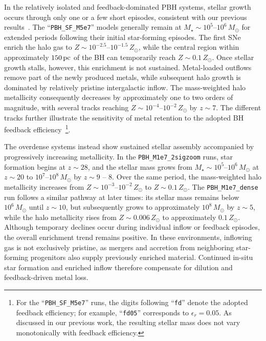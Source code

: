 \documentclass[twocolumn,trackchanges]{aastex701}
\begin{document}
In the relatively isolated and feedback-dominated PBH systems, stellar growth occurs through only one or a few short episodes, consistent with our previous results~\citep{ZhangPBHGalaxy2025ApJ,Zhang2026PBHApJL}. The ``\texttt{PBH\_SF\_M5e7}'' models generally remain at $M_\star\sim10^5$--$10^6\,M_\odot$ for extended periods following their initial star-forming episodes. The first SNe enrich the halo gas to $Z\sim10^{-2.5}$--$10^{-1.5}\,Z_\odot$, while the central region within approximately $150\,{\rm pc}$ of the BH can temporarily reach $Z\sim0.1\,Z_\odot$. Once stellar growth stalls, however, this enrichment is not sustained. Metal-loaded outflows remove part of the newly produced metals, while subsequent halo growth is dominated by relatively pristine intergalactic inflow. The mass-weighted halo metallicity consequently decreases by approximately one to two orders of magnitude, with several tracks reaching $Z\sim10^{-4}$--$10^{-2}\,Z_\odot$ by $z\sim7$. The different tracks further illustrate the sensitivity of metal retention to the adopted BH feedback efficiency~\footnote{For the ``\texttt{PBH\_SF\_M5e7}'' runs, the digits following ``\texttt{fd}'' denote the adopted feedback efficiency; for example, ``\texttt{fd05}'' corresponds to $\epsilon_r=0.05$. As discussed in our previous work, the resulting stellar mass does not vary monotonically with feedback efficiency.}.


The overdense systems instead show sustained stellar assembly accompanied by progressively increasing metallicity. In the \texttt{PBH\_M1e7\_2sigzoom} runs, star formation begins at $z\sim28$, and the stellar mass grows from $M_\star\sim10^5$--$10^6\,M_\odot$ at $z\sim20$ to $10^7$--$10^8\,M_\odot$ by $z\sim9$ -- 8. Over the same period, the mass-weighted halo metallicity increases from $Z\sim10^{-3}$--$10^{-2}\,Z_\odot$ to $Z\sim0.1\,Z_\odot$. The \texttt{PBH\_M1e7\_dense} run follows a similar pathway at later times: its stellar mass remains below $10^6\,M_\odot$ until $z\sim10$, but subsequently grows to approximately $10^8\,M_\odot$ by $z\sim5$, while the halo metallicity rises from $Z\sim0.006\,Z_\odot$ to approximately $0.1\,Z_\odot$. Although temporary declines occur during individual inflow or feedback episodes, the overall enrichment trend remains positive. In these environments, inflowing gas is not exclusively pristine, as mergers and accretion from neighboring star-forming progenitors also supply previously enriched material. Continued in-situ star formation and enriched inflow therefore compensate for dilution and feedback-driven metal loss.
\end{document}
